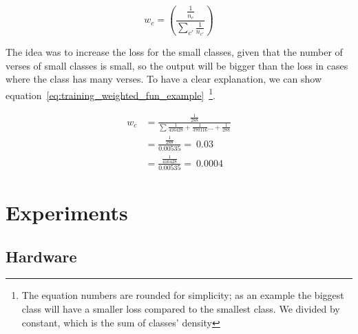 \begin{equation}\label{eq:training_weighted_fun}
 w_c = \left(\frac{\frac{1}{n_c}}{\sum_{c'} \frac{1}{n_{c'}}} \right)
\end{equation}

The idea was to increase the loss for the small classes, given that the number of verses of small classes is small, so the output will be bigger than the loss in cases where the class has many verses. To have a clear explanation, we can show equation~\ref{eq:training_weighted_fun_example}~\footnote{The equation numbers are rounded for simplicity; as an example the biggest class will have a smaller loss compared to the smallest class. We divided by constant, which is the sum of classes’ density}.

\begin{subequations}
 \begin{align}
 w_c &= \frac{\frac{1}{288}}{\sum\frac{1}{416428}+\frac{1}{370116}\dots+\frac{1}{288}}\\
  &= \frac{\frac{1}{288}}{0.00535} = ~0.03 \\
  &= \frac{\frac{1}{416428}}{0.00535} = ~0.0004
 \end{align}\label{eq:training_weighted_fun_example}
\end{subequations}

\clearpage

\section{Experiments}

\subsection{Hardware}

